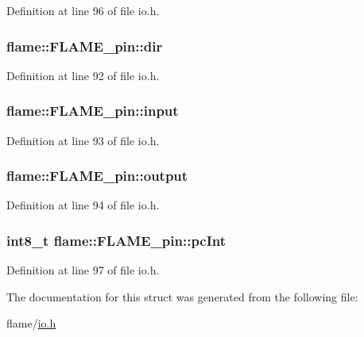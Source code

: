Definition at line 96 of file io.\-h.

\hypertarget{structflame_1_1_f_l_a_m_e__pin_af270bfbe697774b7efdcd1e5fca607ca}{
\subsubsection[{dir}]{ flame\-::\-F\-L\-A\-M\-E\-\_\-pin\-::dir}}\label{structflame_1_1_f_l_a_m_e__pin_af270bfbe697774b7efdcd1e5fca607ca}


Definition at line 92 of file io.\-h.

\hypertarget{structflame_1_1_f_l_a_m_e__pin_ac183e7bd5580c27281bd90f5e5f90e75}{
\subsubsection[{input}]{ flame\-::\-F\-L\-A\-M\-E\-\_\-pin\-::input}}\label{structflame_1_1_f_l_a_m_e__pin_ac183e7bd5580c27281bd90f5e5f90e75}


Definition at line 93 of file io.\-h.

\hypertarget{structflame_1_1_f_l_a_m_e__pin_aa7a88c3c95421bf3c9a7858b6f6f7709}{
\subsubsection[{output}]{ flame\-::\-F\-L\-A\-M\-E\-\_\-pin\-::output}}\label{structflame_1_1_f_l_a_m_e__pin_aa7a88c3c95421bf3c9a7858b6f6f7709}


Definition at line 94 of file io.\-h.

\hypertarget{structflame_1_1_f_l_a_m_e__pin_a42329feb988c345b2a76d6c3c1c7e7f7}{
\subsubsection[{pc\-Int}]{\setlength{\rightskip}{0pt plus 5cm}int8\-\_\-t flame\-::\-F\-L\-A\-M\-E\-\_\-pin\-::pc\-Int}}\label{structflame_1_1_f_l_a_m_e__pin_a42329feb988c345b2a76d6c3c1c7e7f7}


Definition at line 97 of file io.\-h.



The documentation for this struct was generated from the following file\-:\begin{DoxyCompactItemize}
\item 
flame/\hyperlink{io_8h}{io.\-h}\end{DoxyCompactItemize}
